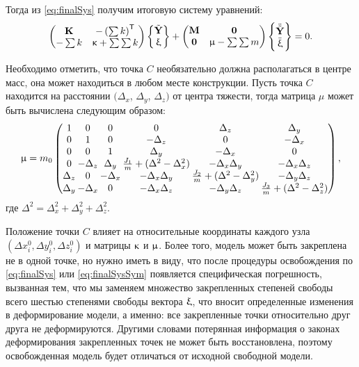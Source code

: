 Тогда из \eqref{eq:finalSys} получим итоговую систему уравнений:
\begin{equation}
	\begin{pmatrix}
		\mathbf{K} & -\left( \sum k \right) ^ \mathsf{T} \\
		 -\sum k & \upkappa + \sum \sum k
	\end{pmatrix}
	\begin{Bmatrix}
		\tilde{\mathbf{Y}} \\
		\upxi
	\end{Bmatrix}
	+
	\begin{pmatrix}
		\mathbf{M} & \mathbf{0} \\
		\mathbf{0} & \upmu - \sum \sum m
	\end{pmatrix}
		\begin{Bmatrix}
		\ddot{\tilde{\mathbf{Y}}} \\
		\ddot{\upxi}
	\end{Bmatrix}
	= 0.
	\label{eq:finalSysSym}
\end{equation}

Необходимо отметить, что точка $ C $ необязательно должна располагаться в центре масс, она может находиться в любом месте конструкции. Пусть точка $ C $ находится на расстоянии $ (\Delta_x$, $\Delta_y$, $\Delta_z) $ от центра тяжести, тогда матрица $ \mu $ может быть вычислена следующим образом:
\begin{equation}
	\mat{\mu} = m_0
	\begingroup
	\setlength\arraycolsep{1pt}
	\begin{pmatrix}
		1 & 0 & 0 & 0 & \Delta_z & \Delta_y \\
		0 & 1 & 0 & -\Delta_z & 0 & -\Delta_x \\
		0 & 0 & 1 & \Delta_y & -\Delta_x & 0 \\
		0 & -\Delta_z & \Delta_y & \frac{J_1}{m} + (\Delta^2 - \Delta_x^2) & -\Delta_x \Delta_y & -\Delta_x \Delta_z \\
		\Delta_z & 0 & -\Delta_x & -\Delta_x \Delta_y & \frac{J_2}{m} + (\Delta^2 - \Delta_y^2) & -\Delta_y \Delta_z \\
		\Delta_y & - \Delta_x & 0 & -\Delta_x \Delta_z & -\Delta_y \Delta_z & \frac{J_3}{m} + (\Delta^2 - \Delta_z^2)
	\end{pmatrix},
	\endgroup
\end{equation}
где $ \Delta^2 = \Delta_x^2 + \Delta_y^2 + \Delta_z^2 $.

Положение точки $ C $ влияет на относительные координаты каждого узла $ (\Delta x^0_i, \Delta y^0_i, \Delta z^0_i) $ и матрицы $ \mathbf{\upkappa} $ и $ \mathbf{\upmu} $. Более того, модель может быть закреплена не в одной точке, но нужно иметь в виду, что после процедуры освобождения по \eqref{eq:finalSys} или \eqref{eq:finalSysSym} появляется специфическая погрешность, вызванная тем, что мы заменяем множество закрепленных степеней свободы всего шестью степенями свободы вектора $ \mathbf{\upxi} $, что вносит определенные изменения в деформирование модели, а именно: все закрепленные точки относительно друг друга не деформируются. Другими словами потерянная информация о законах деформирования закрепленных точек не может быть восстановлена, поэтому освобожденная модель будет отличаться от исходной свободной модели.

